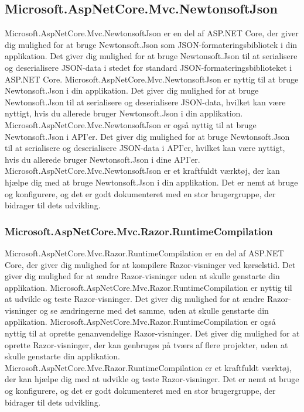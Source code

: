 \subsection{Microsoft.AspNetCore.Mvc.NewtonsoftJson}
Microsoft.AspNetCore.Mvc.NewtonsoftJson er en del af ASP.NET Core, der giver dig mulighed for at bruge Newtonsoft.Json som JSON-formateringsbibliotek i din applikation. Det giver dig mulighed for at bruge Newtonsoft.Json til at serialisere og deserialisere JSON-data i stedet for standard JSON-formateringsbiblioteket i ASP.NET Core.
Microsoft.AspNetCore.Mvc.NewtonsoftJson er nyttig til at bruge Newtonsoft.Json i din applikation. Det giver dig mulighed for at bruge Newtonsoft.Json til at serialisere og deserialisere JSON-data, hvilket kan være nyttigt, hvis du allerede bruger Newtonsoft.Json i din applikation.
Microsoft.AspNetCore.Mvc.NewtonsoftJson er også nyttig til at bruge Newtonsoft.Json i API'er. Det giver dig mulighed for at bruge Newtonsoft.Json til at serialisere og deserialisere JSON-data i API'er, hvilket kan være nyttigt, hvis du allerede bruger Newtonsoft.Json i dine API'er.
Microsoft.AspNetCore.Mvc.NewtonsoftJson er et kraftfuldt værktøj, der kan hjælpe dig med at bruge Newtonsoft.Json i din applikation. Det er nemt at bruge og konfigurere, og det er godt dokumenteret med en stor brugergruppe, der bidrager til dets udvikling.

\subsubsection{Microsoft.AspNetCore.Mvc.Razor.RuntimeCompilation}
Microsoft.AspNetCore.Mvc.Razor.RuntimeCompilation er en del af ASP.NET Core, der giver dig mulighed for at kompilere Razor-visninger ved kørselstid. Det giver dig mulighed for at ændre Razor-visninger uden at skulle genstarte din applikation.
Microsoft.AspNetCore.Mvc.Razor.RuntimeCompilation er nyttig til at udvikle og teste Razor-visninger. Det giver dig mulighed for at ændre Razor-visninger og se ændringerne med det samme, uden at skulle genstarte din applikation.
Microsoft.AspNetCore.Mvc.Razor.RuntimeCompilation er også nyttig til at oprette genanvendelige Razor-visninger. Det giver dig mulighed for at oprette Razor-visninger, der kan genbruges på tværs af flere projekter, uden at skulle genstarte din applikation.
Microsoft.AspNetCore.Mvc.Razor.RuntimeCompilation er et kraftfuldt værktøj, der kan hjælpe dig med at udvikle og teste Razor-visninger. Det er nemt at bruge og konfigurere, og det er godt dokumenteret med en stor brugergruppe, der bidrager til dets udvikling.

